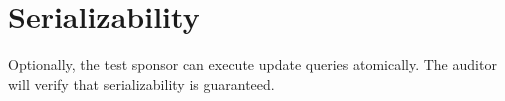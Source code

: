 
\section{Serializability}

Optionally, the test sponsor can execute update queries atomically. The auditor
will verify that serializability is guaranteed.
